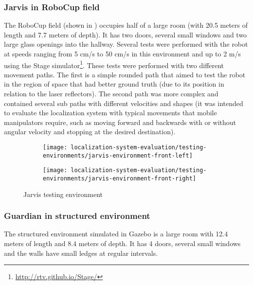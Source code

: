 \subsubsection{Jarvis in RoboCup field}

The RoboCup field (shown in ) occupies half of a large room (with 20.5 meters of length and 7.7 meters of depth). It has two doors, several small windows and two large glass openings into the hallway. Several tests were performed with the robot at speeds ranging from 5 cm/s to 50 cm/s in this environment and up to 2 m/s using the Stage simulator\footnote{\url{http://rtv.github.io/Stage/}}. These tests were performed with two different movement paths. The first is a simple rounded path that aimed to test the robot in the region of space that had better ground truth (due to its position in relation to the laser reflectors). The second path was more complex and contained several sub paths with different velocities and shapes (it was intended to evaluate the localization system with typical movements that mobile manipulators require, such as moving forward and backwards with or without angular velocity and stopping at the desired destination).


\begin{figure}[H]
	\centering
	\begin{subfigure}[ht]{0.31\textwidth}
		\centering
		\texttt{[image: localization-system-evaluation/testing-environments/jarvis-environment-front-left]}
	\end{subfigure}
	\begin{subfigure}[ht]{0.31\textwidth}
		\centering
		\texttt{[image: localization-system-evaluation/testing-environments/jarvis-environment-front-right]}
	\end{subfigure}
	\caption{Jarvis testing environment}
	\label{fig:localization-system-evaluation_jarvis-tests-environment}
\end{figure}


\subsubsection{Guardian in structured environment}

The structured environment simulated in Gazebo is a large room with 12.4 meters of length and 8.4 meters of depth. It has 4 doors, several small windows and the walls have small ledges at regular intervals.

